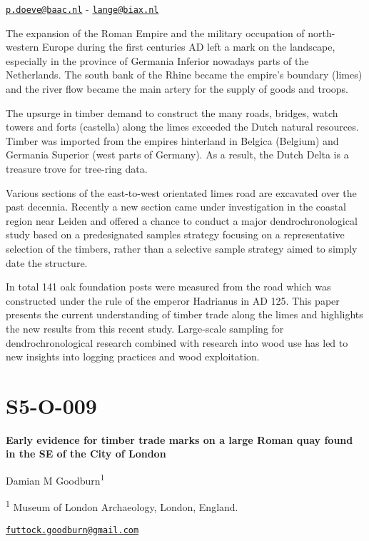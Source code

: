 \documentclass[
]{book}
\begin{document}
\href{mailto:p.doeve@baac.nl}{\nolinkurl{p.doeve@baac.nl}} - \href{mailto:lange@biax.nl}{\nolinkurl{lange@biax.nl}}

The expansion of the Roman Empire and the military occupation of north-western Europe during the first centuries AD left a mark on the landscape, especially in the province of Germania Inferior nowadays parts of the Netherlands. The south bank of the Rhine became the empire's boundary (limes) and the river flow became the main artery for the supply of goods and troops.

The upsurge in timber demand to construct the many roads, bridges, watch towers and forts (castella) along the limes exceeded the Dutch natural resources. Timber was imported from the empires hinterland in Belgica (Belgium) and Germania Superior (west parts of Germany). As a result, the Dutch Delta is a treasure trove for tree-ring data.

Various sections of the east-to-west orientated limes road are excavated over the past decennia. Recently a new section came under investigation in the coastal region near Leiden and offered a chance to conduct a major dendrochronological study based on a predesignated samples strategy focusing on a representative selection of the timbers, rather than a selective sample strategy aimed to simply date the structure.

In total 141 oak foundation posts were measured from the road which was constructed under the rule of the emperor Hadrianus in AD 125. This paper presents the current understanding of timber trade along the limes and highlights the new results from this recent study. Large-scale sampling for dendrochronological research combined with research into wood use has led to new insights into logging practices and wood exploitation.

\hypertarget{s5-o-009}{%
\section*{S5-O-009}\label{s5-o-009}}

\textbf{Early evidence for timber trade marks on a large Roman quay found in the SE of the City of London}

Damian M Goodburn\textsuperscript{1}

\textsuperscript{1} Museum of London Archaeology, London, England.

\href{mailto:futtock.goodburn@gmail.com}{\nolinkurl{futtock.goodburn@gmail.com}}
\end{document}
